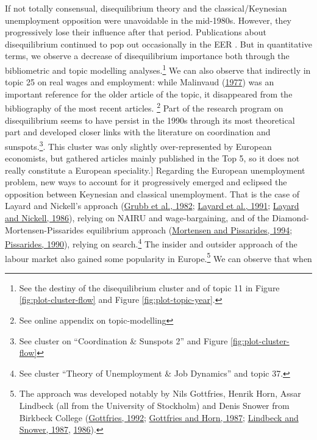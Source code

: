 \documentclass[
  12pt,
  onecolumn]{article}
\begin{document}
If not totally consensual, disequilibrium theory and the
classical/Keynesian unemployment opposition were unavoidable in the
mid-1980s. However, they progressively lose their influence after that
period. Publications about disequilibrium continued to pop out
occasionally in the EER . But in quantitative terms, we observe a
decrease of disequilibrium importance both through the bibliometric and
topic modelling analyses.\footnote{See the destiny of the disequilibrium
  cluster and of topic 11 in Figure \ref{fig:plot-cluster-flow} and
  Figure \ref{fig:plot-topic-year}.} We can also observe that indirectly
in topic 25 on real wages and employment: while Malinvaud
(\protect\hyperlink{ref-malinvaud1977}{1977}) was an important reference
for the older article of the topic, it disappeared from the bibliography
of the most recent articles. \footnote{See online appendix on
  topic-modelling} Part of the research program on disequilibrium seems
to have persist in the 1990s through its most theoretical part and
developed closer links with the literature on coordination and
sunspots.\footnote{See cluster on ``Coordination \& Sunspots 2'' and
  Figure \ref{fig:plot-cluster-flow}}. This cluster was only slightly
over-represented by European economists, but gathered articles mainly
published in the Top 5, so it does not really constitute a European
speciality.{]} Regarding the European unemployment problem, new ways to
account for it progressively emerged and eclipsed the opposition between
Keynesian and classical unemployment. That is the case of Layard and
Nickell's approach (\protect\hyperlink{ref-grubb1982}{Grubb et al.,
1982}; \protect\hyperlink{ref-layard1991a}{Layard et al., 1991};
\protect\hyperlink{ref-layard1986}{Layard and Nickell, 1986}), relying
on NAIRU and wage-bargaining, and of the Diamond-Mortensen-Pissarides
equilibrium approach (\protect\hyperlink{ref-mortensen1994}{Mortensen
and Pissarides, 1994};
\protect\hyperlink{ref-pissarides1990}{Pissarides, 1990}), relying on
search.\footnote{See cluster ``Theory of Unemployment \& Job Dynamics''
  and topic 37.} The insider and outsider approach of the labour market
also gained some popularity in Europe.\footnote{The approach was
  developed notably by Nils Gottfries, Henrik Horn, Assar Lindbeck (all
  from the University of Stockholm) and Denis Snower from Birkbeck
  College (\protect\hyperlink{ref-gottfries1992}{Gottfries, 1992};
  \protect\hyperlink{ref-gottfries1987}{Gottfries and Horn, 1987};
  \protect\hyperlink{ref-lindbeck1987a}{Lindbeck and Snower, 1987},
  \protect\hyperlink{ref-lindbeck1986}{1986}).} We can observe that when
\end{document}

